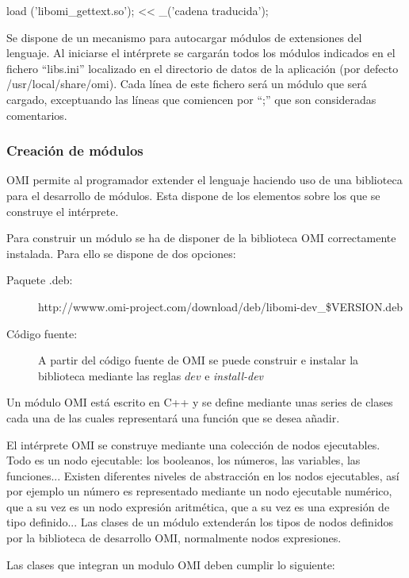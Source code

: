 \begin{myverbatim}  
   load ('libomi_gettext.so');
   << _('cadena traducida');
\end{myverbatim}

Se dispone de un mecanismo para autocargar módulos de extensiones del lenguaje. Al iniciarse 
el intérprete se cargarán todos los módulos indicados en el fichero ``libs.ini'' localizado 
en el directorio de datos de la aplicación (por defecto /usr/local/share/omi). Cada línea 
de este fichero será un módulo que será cargado, exceptuando las líneas que comiencen por ``;'' que
son consideradas comentarios.

\subsubsection{Creación de módulos}
OMI permite al programador extender el lenguaje haciendo uso de una biblioteca para el desarrollo de módulos. Esta
dispone de los elementos sobre los que se construye el intérprete. 

Para construir un módulo se ha de disponer de la biblioteca OMI correctamente instalada. Para ello se
dispone de dos opciones:

\begin{description}
\item[Paquete .deb:] http://wwww.omi-project.com/download/deb/libomi-dev\_\$VERSION.deb
\item[Código fuente:] A partir del código fuente de OMI se puede construir e instalar la biblioteca 
mediante las reglas $dev$ e \emph{install-dev}
\end{description}

Un módulo OMI está escrito en C++ y se define mediante unas series de clases cada una de las cuales representará una
función que se desea añadir. 

El intérprete OMI se construye mediante una colección de nodos ejecutables. Todo es un nodo ejecutable: los booleanos,
los números, las variables, las funciones... Existen diferentes niveles de abstracción en los nodos ejecutables, así por ejemplo
un número es representado mediante un nodo ejecutable numérico, que a su vez es un nodo expresión aritmética, que a su vez es
una expresión de tipo definido... Las clases de un módulo extenderán los tipos de nodos definidos por la biblioteca de desarrollo OMI, 
normalmente nodos expresiones.

Las clases que integran un modulo OMI deben cumplir lo siguiente:

